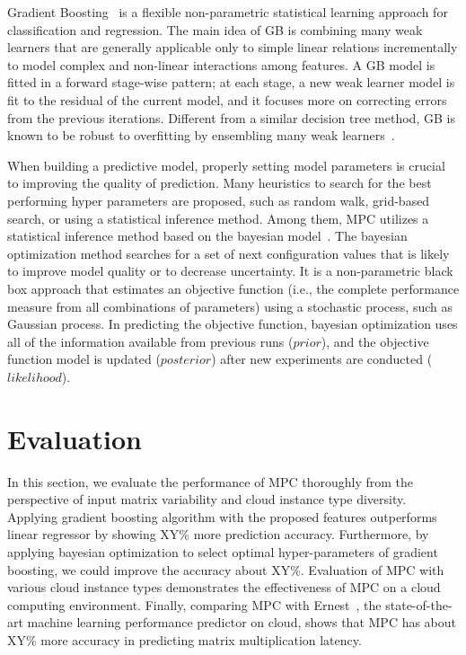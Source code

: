 \documentclass[10pt, conference, compsocconf]{IEEEtran}
\begin{document}
Gradient Boosting~\cite{gradient-boosting} is a flexible non-parametric statistical learning approach for classification and regression. The main idea of GB is combining many weak learners that are generally applicable only to simple linear relations incrementally to model complex and non-linear interactions among features. A GB model is fitted in a forward stage-wise pattern; at each stage, a new weak learner model is fit to the residual of the current model, and it focuses more on correcting errors from the previous iterations. Different from a similar decision tree method, GB is known to be robust to overfitting by ensembling many weak learners~\cite{random-forest}.

When building a predictive model, properly setting model parameters is crucial to improving the quality of prediction. Many heuristics to search for the best performing hyper parameters are proposed, such as random walk, grid-based search, or using a statistical inference method. Among them, MPC utilizes a statistical inference method based on the bayesian model~\cite{bayesian-optimization}. The bayesian optimization method searches for a set of next configuration values that is likely to improve model quality or to decrease uncertainty. It is a non-parametric black box approach that estimates an objective function (i.e., the complete performance measure from all combinations of parameters) using a stochastic process, such as Gaussian process. In predicting the objective function, bayesian optimization uses all of the information available from previous runs ($prior$), and the objective function model is updated ($posterior$) after new experiments are conducted ($likelihood$). 

\section{Evaluation}{\label{sec:eval}}
In this section, we evaluate the performance of MPC thoroughly from the perspective of input matrix variability and cloud instance type diversity. Applying gradient boosting algorithm with the proposed features outperforms linear regressor by showing XY\% more prediction accuracy. Furthermore, by applying bayesian optimization to select optimal hyper-parameters of gradient boosting, we could improve the accuracy about XY\%. Evaluation of MPC with various cloud instance types demonstrates the effectiveness of MPC on a cloud computing environment. Finally, comparing MPC with Ernest~\cite{ernest}, the state-of-the-art machine learning performance predictor on cloud, shows that MPC has about XY\% more accuracy in predicting matrix multiplication latency.
\end{document}
